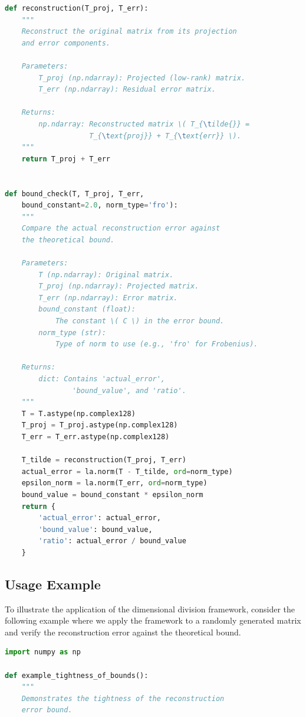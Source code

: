 \documentclass[sn-mathphys-num]{sn-jnl}
\theoremstyle{thmstyleone}
\theoremstyle{thmstyletwo}
\theoremstyle{thmstylethree}
\begin{document}
\begin{appendices}
\begin{lstlisting}[language=Python,caption={Annotated Python implementation of the dimensional division framework.},label={lst:dim-division-implementation}]
def reconstruction(T_proj, T_err):
    """
    Reconstruct the original matrix from its projection 
    and error components.

    Parameters:
        T_proj (np.ndarray): Projected (low-rank) matrix.
        T_err (np.ndarray): Residual error matrix.
    
    Returns:
        np.ndarray: Reconstructed matrix \( T_{\tilde{}} = 
                    T_{\text{proj}} + T_{\text{err}} \).
    """
    return T_proj + T_err


def bound_check(T, T_proj, T_err, 
    bound_constant=2.0, norm_type='fro'):
    """
    Compare the actual reconstruction error against 
    the theoretical bound.
    
    Parameters:
        T (np.ndarray): Original matrix.
        T_proj (np.ndarray): Projected matrix.
        T_err (np.ndarray): Error matrix.
        bound_constant (float): 
            The constant \( C \) in the error bound.
        norm_type (str): 
            Type of norm to use (e.g., 'fro' for Frobenius).
        
    Returns:
        dict: Contains 'actual_error', 
                'bound_value', and 'ratio'.
    """
    T = T.astype(np.complex128)
    T_proj = T_proj.astype(np.complex128)
    T_err = T_err.astype(np.complex128)
    
    T_tilde = reconstruction(T_proj, T_err)
    actual_error = la.norm(T - T_tilde, ord=norm_type)
    epsilon_norm = la.norm(T_err, ord=norm_type)
    bound_value = bound_constant * epsilon_norm
    return {
        'actual_error': actual_error,
        'bound_value': bound_value,
        'ratio': actual_error / bound_value 
    }
\end{lstlisting}

\subsection{Usage Example}

To illustrate the application of the dimensional division framework, consider the following example where we apply the framework to a randomly generated matrix and verify the reconstruction error against the theoretical bound.

\begin{lstlisting}[language=Python,caption={Example usage of the dimensional division framework.},label={lst:dim-division-usage}]
import numpy as np

def example_tightness_of_bounds():
    """
    Demonstrates the tightness of the reconstruction 
    error bound.
    

\end{lstlisting}
\end{appendices}
\end{document}

